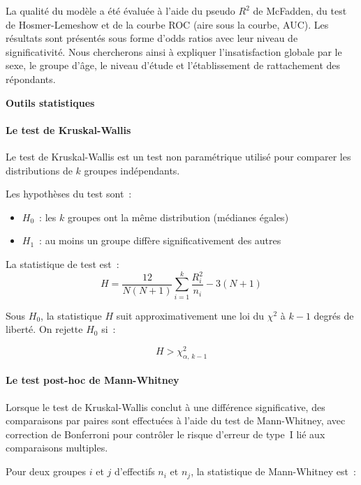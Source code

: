\documentclass[
12pt,          %
a4paper,       %
oneside,      %
openright      %
]{report}          %
\begin{document}
			La qualité du modèle a été évaluée à l'aide du pseudo $R^2$ de McFadden, du test de Hosmer-Lemeshow et de la courbe ROC (aire sous la courbe, AUC). Les résultats sont présentés sous forme d'odds ratios avec leur niveau de significativité. Nous chercherons ainsi à expliquer l'insatisfaction globale par le sexe, le groupe d'âge, le niveau d'étude et l'établissement de rattachement des répondants.
			
		\textbf{Outils statistiques}
		\paragraph{Le test de Kruskal-Wallis}
		
		Le test de Kruskal-Wallis est un test non param\'etrique
		utilis\'e pour comparer les distributions de $k$ groupes
		ind\'ependants.
		
		\medskip
		\noindent Les hypoth\`eses du test sont~:
		\begin{itemize}
			\item $H_0$~: les $k$ groupes ont la m\^eme
			distribution (m\'edianes \'egales)
			\item $H_1$~: au moins un groupe diff\`ere
			significativement des autres
		\end{itemize}
		
		\medskip
		\noindent La statistique de test est~:
		\begin{equation}
			H = \frac{12}{N(N+1)}
			\sum_{i=1}^{k} \frac{R_i^2}{n_i}
			- 3(N+1)
		\end{equation}
		
		\medskip
		\noindent Sous $H_0$, la statistique $H$ suit
		approximativement une loi du $\chi^2$ \`a $k-1$
		degr\'es de libert\'e. On rejette $H_0$ si~:
		
		\begin{equation}
			H > \chi^2_{\alpha,\, k-1}
		\end{equation}
		
		
		\paragraph{Le test post-hoc de Mann-Whitney}
		Lorsque le test de Kruskal-Wallis conclut \`a une
		diff\'erence significative, des comparaisons par paires
		sont effectu\'ees \`a l'aide du test de Mann-Whitney,
		avec correction de Bonferroni pour contr\^oler le
		risque d'erreur de type~I li\'e aux comparaisons
		multiples.
		
		\medskip
		\noindent Pour deux groupes $i$ et $j$ d'effectifs
		$n_i$ et $n_j$, la statistique de Mann-Whitney est~:
		
\end{document}

